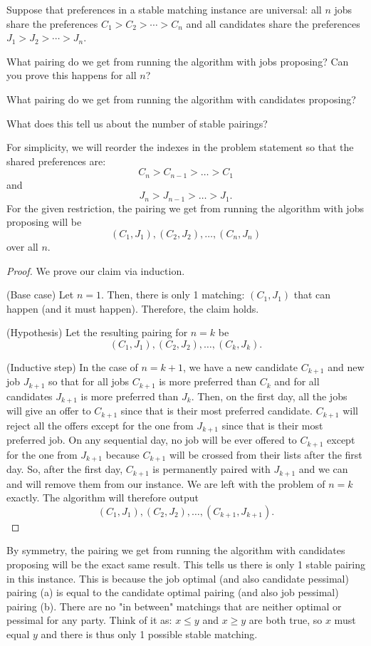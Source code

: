 \documentclass[11pt]{article}
\begin{document}
Suppose that preferences in a stable matching instance are universal: all $n$ jobs share the preferences $C_1>C_2>\cdots>C_n$ and all candidates share the preferences $J_1>J_2>\cdots>J_n$.
\begin{Parts}
    \Part What pairing do we get from running the algorithm with jobs proposing? Can you prove this happens for all $n$?
    

    \Part What pairing do we get from running the algorithm with candidates proposing?
    

    \Part What does this tell us about the number of stable pairings?
    
\end{Parts}
\begin{solution}
\begin{Parts}
\Part 
For simplicity, we will reorder the indexes in the problem statement so that the shared preferences are:
$$C_n>C_{n-1}>\dots>C_1$$
and 
$$J_n>J_{n-1}>\dots>J_1.$$
For the given restriction, the pairing
we get from running the algorithm with jobs proposing will be
$$(C_1,J_1),(C_2,J_2),\dots,(C_n,J_n)$$
over all $n$.
\begin{proof}
We prove our claim via induction.

(Base case) Let $n=1$. Then, there is only 1 matching: $(C_1,J_1)$ that can happen (and it must happen).
Therefore, the claim holds.

(Hypothesis) Let the resulting pairing for $n=k$ be 
$$(C_1,J_1),(C_2,J_2),\dots,(C_k,J_k).$$

(Inductive step) In the case of $n=k+1$, we have a 
new candidate $C_{k+1}$ and new job $J_{k+1}$ so that
for all jobs $C_{k+1}$ is more preferred than $C_k$ and
for all candidates $J_{k+1}$ is more preferred than $J_{k}$.
Then, on the first day, all the jobs will give an offer to $C_{k+1}$ 
since that is their most preferred candidate.
$C_{k+1}$ will reject all the offers except for the one from $J_{k+1}$
since that is their most preferred job. 
On any sequential day, no job will be ever offered to $C_{k+1}$
except for the one from $J_{k+1}$ because $C_{k+1}$ will be crossed from their
lists after the first day. So, after the first day, $C_{k+1}$ is 
permanently paired with $J_{k+1}$ and we can and will remove them from our instance.
We are left with the problem of $n=k$ exactly. 
The algorithm will therefore output
$$(C_1,J_1),(C_2,J_2),\dots,(C_{k+1},J_{k+1}).$$
\end{proof}
\Part By symmetry, the pairing we get from running the algorithm with candidates proposing will be the exact same result.
\Part This tells us there is only 1 stable pairing in this instance. 
This is because the job optimal (and also candidate pessimal) pairing (a) is equal to 
the candidate optimal pairing (and also job pessimal) pairing (b).
There are no "in between" matchings that are neither optimal or pessimal for any party.
Think of it as: $x\leq y$ and $x\geq y$ are both true, so $x$ must equal $y$ and there is thus only 1 possible stable matching.
\end{Parts}
\end{solution} \newpage
\end{document}
